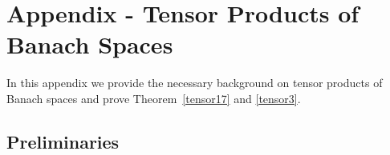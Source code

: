 \documentclass[12pt]{article}
\begin{document}

\section{Appendix - Tensor Products of Banach Spaces}
\label{Sec:Appendix}


In this appendix we provide the necessary background on tensor products of Banach spaces and  prove Theorem~\ref{tensor17} and \ref{tensor3}.



\subsection{Preliminaries}
\label{tpbs}

\end{document}
